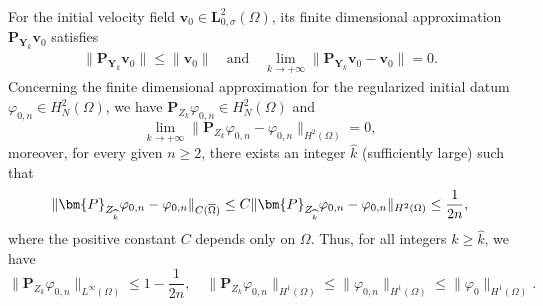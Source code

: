 \documentclass[11pt,reqno]{amsart}
\def\be{\begin{equation}}
\def\ee{\end{equation}}
\begin{document}
For the initial velocity field $\bm{v}_{0}\in \bm{L}^2_{0,\sigma}(\Omega)$, its finite dimensional approximation $\bm{P}_{\bm{Y}_{k}} \bm{v}_{0}$ satisfies
%
\begin{align*}
\|\bm{P}_{\bm{Y}_{k}} \bm{v}_{0}\|\leq \|\bm{v}_{0}\|
\quad \text{and} \quad
\lim_{k\to +\infty} \|\bm{P}_{\bm{Y}_{k}} \bm{v}_{0}-  \bm{v}_{0}\|=0.
\end{align*}
%
Concerning the finite dimensional approximation for the regularized initial datum $\varphi_{0,n}\in H^2_N(\Omega)$, we have  $\bm{P}_{Z_{k}}\varphi_{0,n}\in H^2_N(\Omega)$ and
$$
\lim_{k\to+\infty}\|\bm{P}_{Z_{k}}\varphi_{0,n} -\varphi_{0,n}\|_{H^2(\Omega)}=0,
$$
moreover, for every given $n\geq 2$, there exists an integer $\widehat{k}$ (sufficiently large) such that
\be
\|\bm{P}_{Z_{\widehat{k}}}\varphi_{0,n} -\varphi_{0,n}\|_{C(\overline{\Omega})}\le C\|\bm{P}_{Z_{\widehat{k}}}\varphi_{0,n}-\varphi_{0,n}\|_{H^2(\Omega)} \le \frac{1}{2n},
\notag
\ee
where the positive constant $C$ depends only on $\Omega$. Thus, for all integers $k\geq \widehat{k}$, we have
\be
\label{PZK}
\|\bm{P}_{Z_{k}}\varphi_{0,n}\|_{L^\infty(\Omega)}\le 1-\frac{1}{2n},
\quad   \|\bm{P}_{Z_{k}}\varphi_{0,n}\|_{H^1(\Omega)}
\leq   \|  \varphi_{0,n}\|_{H^1(\Omega)}\leq \|  \varphi_0\|_{H^1(\Omega)}.
\ee
\end{document}
